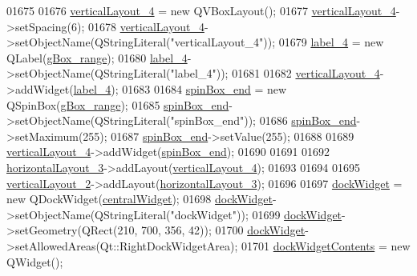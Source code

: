 \begin{DoxyCode}
01675 
01676         \hyperlink{a00027_a6f40fc110b15410c00837a446d57bdbe}{verticalLayout\_4} = \textcolor{keyword}{new} QVBoxLayout();
01677         \hyperlink{a00027_a6f40fc110b15410c00837a446d57bdbe}{verticalLayout\_4}->setSpacing(6);
01678         \hyperlink{a00027_a6f40fc110b15410c00837a446d57bdbe}{verticalLayout\_4}->setObjectName(QStringLiteral(\textcolor{stringliteral}{"verticalLayout\_4"}));
01679         \hyperlink{a00027_a78c7e10730b43c6700cd7216911ed76a}{label\_4} = \textcolor{keyword}{new} QLabel(\hyperlink{a00027_a3c12d0504a310784c3820d1a9ad469c2}{gBox\_range});
01680         \hyperlink{a00027_a78c7e10730b43c6700cd7216911ed76a}{label\_4}->setObjectName(QStringLiteral(\textcolor{stringliteral}{"label\_4"}));
01681 
01682         \hyperlink{a00027_a6f40fc110b15410c00837a446d57bdbe}{verticalLayout\_4}->addWidget(\hyperlink{a00027_a78c7e10730b43c6700cd7216911ed76a}{label\_4});
01683 
01684         \hyperlink{a00027_a8ebeb5caa10878d7806d1f548913b449}{spinBox\_end} = \textcolor{keyword}{new} QSpinBox(\hyperlink{a00027_a3c12d0504a310784c3820d1a9ad469c2}{gBox\_range});
01685         \hyperlink{a00027_a8ebeb5caa10878d7806d1f548913b449}{spinBox\_end}->setObjectName(QStringLiteral(\textcolor{stringliteral}{"spinBox\_end"}));
01686         \hyperlink{a00027_a8ebeb5caa10878d7806d1f548913b449}{spinBox\_end}->setMaximum(255);
01687         \hyperlink{a00027_a8ebeb5caa10878d7806d1f548913b449}{spinBox\_end}->setValue(255);
01688 
01689         \hyperlink{a00027_a6f40fc110b15410c00837a446d57bdbe}{verticalLayout\_4}->addWidget(\hyperlink{a00027_a8ebeb5caa10878d7806d1f548913b449}{spinBox\_end});
01690 
01691 
01692         \hyperlink{a00027_a03ce63974cc69b067c91bbf285cceca8}{horizontalLayout\_3}->addLayout(\hyperlink{a00027_a6f40fc110b15410c00837a446d57bdbe}{verticalLayout\_4});
01693 
01694 
01695         \hyperlink{a00027_a0c01bad60d9f422a1258e710635a2f65}{verticalLayout\_2}->addLayout(\hyperlink{a00027_a03ce63974cc69b067c91bbf285cceca8}{horizontalLayout\_3});
01696 
01697         \hyperlink{a00027_ac8a083c4b66fb317a9b538409ce412e2}{dockWidget} = \textcolor{keyword}{new} QDockWidget(\hyperlink{a00027_a30075506c2116c3ed4ff25e07ae75f81}{centralWidget});
01698         \hyperlink{a00027_ac8a083c4b66fb317a9b538409ce412e2}{dockWidget}->setObjectName(QStringLiteral(\textcolor{stringliteral}{"dockWidget"}));
01699         \hyperlink{a00027_ac8a083c4b66fb317a9b538409ce412e2}{dockWidget}->setGeometry(QRect(210, 700, 356, 42));
01700         \hyperlink{a00027_ac8a083c4b66fb317a9b538409ce412e2}{dockWidget}->setAllowedAreas(Qt::RightDockWidgetArea);
01701         \hyperlink{a00027_a765ded8236736213d556f6f91941808e}{dockWidgetContents} = \textcolor{keyword}{new} QWidget();

\end{DoxyCode}

